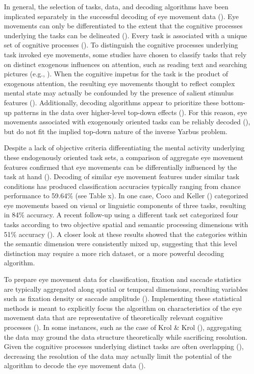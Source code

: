 \documentclass[
  english,
  man]{apa6}
\begin{document}
In general, the selection of tasks, data, and decoding algorithms have been implicated separately in the successful decoding of eye movement data (). Eye movements can only be differentiated to the extent that the cognitive processes underlying the tasks can be delineated (). Every task is associated with a unique set of cognitive processes (). To distinguish the cognitive processes underlying task invoked eye movements, some studies have chosen to classify tasks that rely on distinct exogenous influences on attention, such as reading text and searching pictures (e.g., ). When the cognitive impetus for the task is the product of exogenous attention, the resulting eye movements thought to reflect complex mental state may actually be confounded by the presence of salient stimulus features (). Additionally, decoding algorithms appear to prioritize these bottom-up patterns in the data over higher-level top-down effects (). For this reason, eye movements associated with exogenously oriented tasks can be reliably decoded (), but do not fit the implied top-down nature of the inverse Yarbus problem.

Despite a lack of objective criteria differentiating the mental activity underlying these endogenously oriented task sets, a comparison of aggregate eye movement features confirmed that eye movements can be differentially influenced by the task at hand (). Decoding of similar eye movement features under similar task conditions has produced classification accuracies typically ranging from chance performance to 59.64\% (see Table x). In one case, Coco and Keller () categorized eye movements based on visual or linguistic components of three tasks, resulting in 84\% accuracy. A recent follow-up using a different task set categorized four tasks according to two objective spatial and semantic processing dimensions with 51\% accuracy (). A closer look at these results showed that the categories within the semantic dimension were consistently mixed up, suggesting that this level distinction may require a more rich dataset, or a more powerful decoding algorithm.

To prepare eye movement data for classification, fixation and saccade statistics are typically aggregated along spatial or temporal dimensions, resulting variables such as fixation density or saccade amplitude (). Implementing these statistical methods is meant to explicitly focus the algorithm on characteristics of the eye movement data that are representative of theoretically relevant cognitive processes (). In some instances, such as the case of Krol \& Krol (), aggregating the data may ground the data structure theoretically while sacrificing resolution. Given the cognitive processes underlying distinct tasks are often overlapping (), decreasing the resolution of the data may actually limit the potential of the algorithm to decode the eye movement data ().
\end{document}
